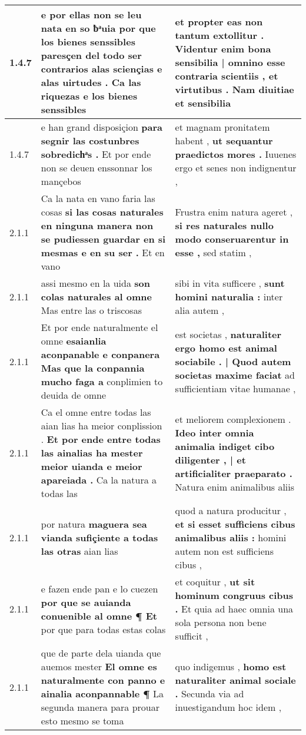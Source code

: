 \begin{tabular}{|p{1cm}|p{6.5cm}|p{6.5cm}|}
1.4.7 & e por ellas non se leu nata en so ƀͣuia \textbf{ por que los bienes senssibles paresçen del todo ser contrarios alas sciençias e alas uirtudes . } Ca las riquezas e los bienes senssibles & et propter eas non tantum extollitur . \textbf{ Videntur enim bona sensibilia | omnino esse contraria scientiis , et virtutibus . } Nam diuitiae et sensibilia \\\hline
1.4.7 & e han grand disposiçion \textbf{ para segnir las costunbres sobredichͣs . } Et por ende non se deuen enssonnar los mançebos & et magnam pronitatem habent , \textbf{ ut sequantur praedictos mores . } Iuuenes ergo et senes non indignentur , \\\hline
2.1.1 & Ca la nata en vano faria las cosas \textbf{ si las cosas naturales en ninguna manera non se pudiessen guardar en si mesmas e en su ser . } Et en vano & Frustra enim natura ageret , \textbf{ si res naturales nullo modo conseruarentur in esse , } sed statim , \\\hline
2.1.1 & assi mesmo en la uida \textbf{ son colas naturales al omne } Mas entre las o triscosas & sibi in vita sufficere , \textbf{ sunt homini naturalia : } inter alia autem , \\\hline
2.1.1 & Et por ende naturalmente el omne \textbf{ esaianlia aconpanable e conpanera Mas que la conpannia mucho faga a } conplimien to deuida de omne & est societas , \textbf{ naturaliter ergo homo est animal sociabile . | Quod autem societas maxime faciat } ad sufficientiam vitae humanae , \\\hline
2.1.1 & Ca el omne entre todas las aian lias ha meior conplission . \textbf{ Et por ende entre todas las ainalias ha mester meior uianda e meior apareiada . } Ca la natura a todas las & et meliorem complexionem . \textbf{ Ideo inter omnia animalia indiget cibo diligenter , | et artificialiter praeparato . } Natura enim animalibus aliis \\\hline
2.1.1 & por natura \textbf{ maguera sea vianda sufiçiente a todas las otras } aian lias & quod a natura producitur , \textbf{ et si esset sufficiens cibus animalibus aliis : } homini autem non est sufficiens cibus , \\\hline
2.1.1 & e fazen ende pan e lo cuezen \textbf{ por que se auianda conuenible al omne ¶ Et } por que para todas estas colas & et coquitur , \textbf{ ut sit hominum congruus cibus . } Et quia ad haec omnia una sola persona non bene sufficit , \\\hline
2.1.1 & que de parte dela uianda que auemos mester \textbf{ El omne es naturalmente con panno e ainalia aconpannable ¶ } La segunda manera para prouar esto mesmo se toma & quo indigemus , \textbf{ homo est naturaliter animal sociale . } Secunda via ad inuestigandum hoc idem , \\\hline

\end{tabular}
